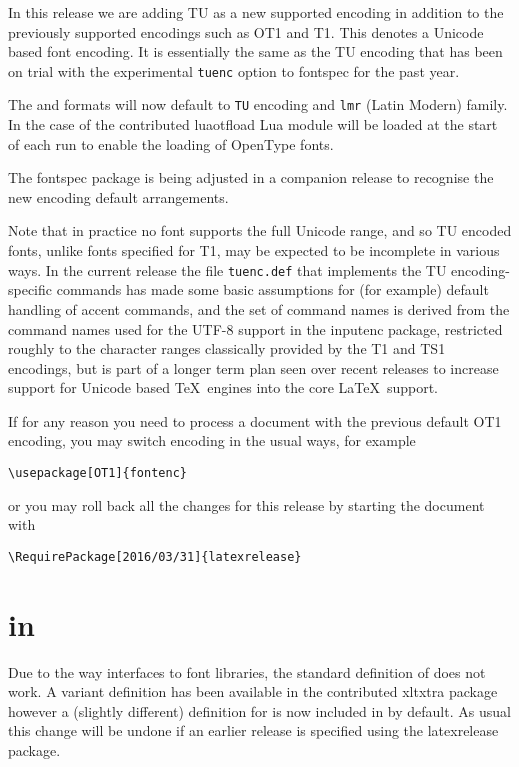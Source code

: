 \documentclass{ltnews}
\begin{document}
In this release we are adding TU as a new supported
encoding in addition to the previously supported encodings such as OT1
and T1. This denotes a Unicode based font encoding. It is essentially
the same as the TU encoding that has been on trial with the
experimental \texttt{tuenc} option to \textsf{fontspec} for the past
year.

The  and  formats will now default
to \texttt{TU} encoding and \texttt{lmr} (Latin Modern) family. In the
case of  the contributed \textsf{luaotfload} Lua
module will be loaded at the start of each run to enable the loading
of OpenType fonts.

The \textsf{fontspec} package is being adjusted in a companion release
to recognise the new encoding default arrangements.

Note that in practice no font supports the full Unicode range, and so
TU encoded fonts, unlike fonts specified for T1, may be expected to be
incomplete in various ways. In the current release the file
\texttt{tuenc.def} that implements the TU encoding-specific commands
has made some basic assumptions for (for example) default handling of
accent commands, and the set of command names is derived from the
command names used for the UTF-8 support in the inputenc package,
restricted roughly to the character ranges classically provided by
the T1 and TS1 encodings, but is part of a longer term plan seen over
recent releases to increase support for Unicode based \TeX\ engines into
the core \LaTeX\ support.



If for any reason you need to process a document with the previous
default OT1 encoding, you may switch encoding in the usual ways, for
example
\begin{verbatim}
\usepackage[OT1]{fontenc}
\end{verbatim}
or you may roll back all the changes for this release by starting the
document with
\begin{verbatim}
\RequirePackage[2016/03/31]{latexrelease}
\end{verbatim}

\section{ in }
Due to the way  interfaces to font libraries, the
standard definition of  does not work.  A variant
definition has been available in the contributed \textsf{xltxtra}
package however a (slightly different) definition for 
is now included in  by default. As usual
this change will be undone if an earlier
release is specified using the \textsf{latexrelease} package.
\end{document}

